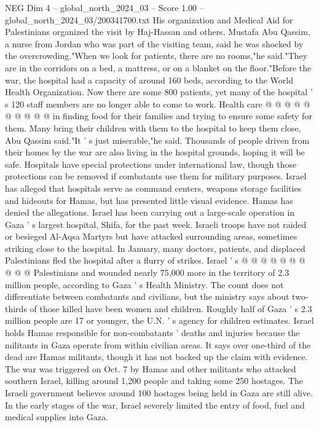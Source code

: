 \begin{textsample}{NEG Dim 4 – global\_north\_2024\_03 – Score 1.00 – global\_north\_2024\_03/200341700.txt}
His organization and Medical Aid for Palestinians organized the visit by Haj-Hassan and others.
Mustafa Abu Qassim, a nurse from Jordan who was part of the visiting team, said he was shocked by the overcrowding."When we look for patients, there are no rooms,"he said."They are in the corridors on a bed, a mattress, or on a blanket on the floor."Before the war, the hospital had a capacity of around 160 beds, according to the World Health Organization.
Now there are some 800 patients, yet many of the hospital ' s 120 staff members are no longer able to come to work.
Health care @ @ @ @ @ @ @ @ @ @ in finding food for their families and trying to ensure some safety for them.
Many bring their children with them to the hospital to keep them close, Abu Qassim said."It ' s just miserable,"he said.
Thousands of people driven from their homes by the war are also living in the hospital grounds, hoping it will be safe.
Hospitals have special protections under international law, though those protections can be removed if combatants use them for military purposes.
Israel has alleged that hospitals serve as command centers, weapons storage facilities and hideouts for Hamas, but has presented little visual evidence.
Hamas has denied the allegations.
Israel has been carrying out a large-scale operation in Gaza ' s largest hospital, Shifa, for the past week.
Israeli troops have not raided or besieged Al-Aqsa Martyrs but have attacked surrounding areas, sometimes striking close to the hospital.
In January, many doctors, patients, and displaced Palestinians fled the hospital after a flurry of strikes.
Israel ' s @ @ @ @ @ @ @ @ @ @ Palestinians and wounded nearly 75,000 more in the territory of 2.3 million people, according to Gaza ' s Health Ministry.
The count does not differentiate between combatants and civilians, but the ministry says about two-thirds of those killed have been women and children.
Roughly half of Gaza ' s 2.3 million people are 17 or younger, the U.N. ' s agency for children estimates.
Israel holds Hamas responsible for non-combatants ' deaths and injuries because the militants in Gaza operate from within civilian areas.
It says over one-third of the dead are Hamas militants, though it has not backed up the claim with evidence.
The war was triggered on Oct. 7 by Hamas and other militants who attacked southern Israel, killing around 1,200 people and taking some 250 hostages.
The Israeli government believes around 100 hostages being held in Gaza are still alive.
In the early stages of the war, Israel severely limited the entry of food, fuel and medical supplies into Gaza.

\end{textsample}
